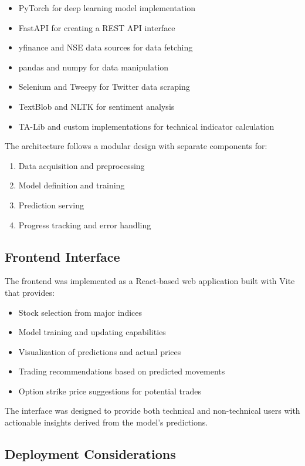 \documentclass[conference]{IEEEtran}
\begin{document}
\begin{itemize}
\item PyTorch for deep learning model implementation
\item FastAPI for creating a REST API interface
\item yfinance and NSE data sources for data fetching
\item pandas and numpy for data manipulation
\item Selenium and Tweepy for Twitter data scraping
\item TextBlob and NLTK for sentiment analysis
\item TA-Lib and custom implementations for technical indicator calculation
\end{itemize}

The architecture follows a modular design with separate components for:

\begin{enumerate}
\item Data acquisition and preprocessing
\item Model definition and training
\item Prediction serving
\item Progress tracking and error handling
\end{enumerate}

\subsection{Frontend Interface}

The frontend was implemented as a React-based web application built with Vite that provides:

\begin{itemize}
\item Stock selection from major indices
\item Model training and updating capabilities
\item Visualization of predictions and actual prices
\item Trading recommendations based on predicted movements
\item Option strike price suggestions for potential trades
\end{itemize}

The interface was designed to provide both technical and non-technical users with actionable insights derived from the model's predictions.

\subsection{Deployment Considerations}
\end{document}
